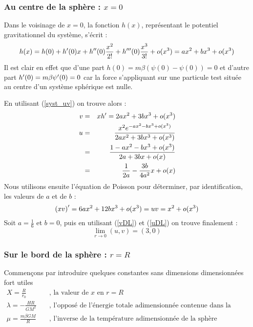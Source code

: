 
\subsubsection{Au centre de la sphère : $x = 0$}
	Dans le voisinage de $x=0$, la fonction $h(x)$, représentant le potentiel gravitationnel du système, s'écrit :
	\begin{eqnarray*}
		h(x) = h(0) + h'(0)x + h^{\prime\prime}(0)\frac{x^2}{2!} + h^{\prime\prime\prime}(0)\frac{x^3}{3!} + o(x^3) = ax^2 + bx^3 + o(x^3)
	\end{eqnarray*}
	Il est clair en effet que d'une part \mbox{$h(0) = m\beta\left(\psi(0) - \psi(0)\right) = 0$} et d'autre part \mbox{$h'(0) = m\beta\psi'(0) = 0$} car la force s'appliquant sur une particule test située au centre d'un système sphérique est nulle.

	En utilisant (\ref{syst_uv}) on trouve alors :
	\begin{eqnarray}
		v &=& xh' = 2ax^2 + 3bx^3 + o(x^3)\label{vDL} \\
		u &=& \frac{x^2e^{-ax^2 - bx^3 + o(x^3)}}{2ax^2 + 3bx^3 + o(x^3)} \\
		  &=& \frac{1 - ax^2 - bx^3 + o(x^3)}{2a + 3bx +o(x)} \\
		  &=& \frac{1}{2a} - \frac{3b}{4a^2}x + o(x)\label{uDL}
	\end{eqnarray}
	Nous utilisons ensuite l'équation de Poisson pour déterminer, par identification, les valeurs de $a$ et de $b$ :
	\begin{eqnarray}
		\left(xv\right)' = 6ax^2 + 12bx^3 + o(x^3) = uv = x^2 + o(x^3)\label{PoisDL}
	\end{eqnarray}
	Soit $a = \frac{1}{6}$ et $b=0$, puis en utilisant (\ref{vDL}) et (\ref{uDL})  on trouve finalement :
	$$\lim_{r\to 0}(u,v) = (3,0)$$

\subsubsection{Sur le bord de la sphère : $r = R$}
	Commençons par introduire quelques constantes sans dimensions dimensionnées fort utiles 
	\begin{eqnarray}
	X           = \frac{R}{r_0}&\;&\textrm{, la valeur de }x\textrm{ en }r=R \\
	\lambda  = - \frac{H R}{G M^2}&\;&\textrm{, l'opposé de l'énergie totale adimensionnée contenue dans la sphère}\\
	\mu       = \frac{m\beta GM}{R} &\;&\textrm{, l'inverse de la température adimensionnée de la sphère}
	\end{eqnarray}
	
